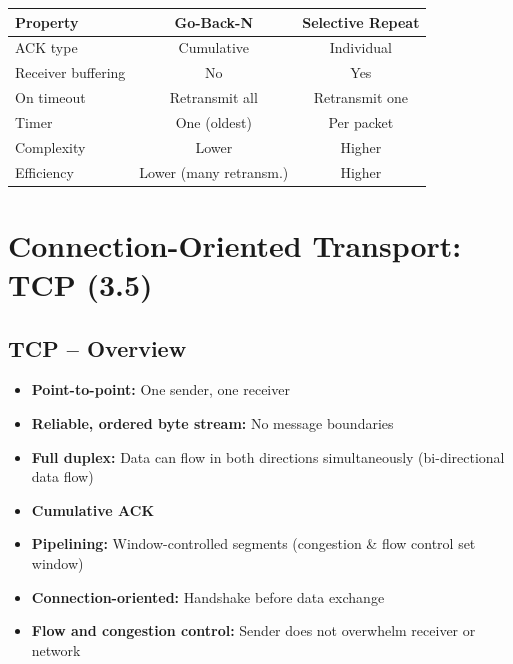 \begin{imagebox}
\end{imagebox}

\begin{center}
\begin{tabular}{lcc}
\toprule
\textbf{Property} & \textbf{Go-Back-N} & \textbf{Selective Repeat} \\
\midrule
ACK type & Cumulative & Individual \\
Receiver buffering & No & Yes \\
On timeout & Retransmit all & Retransmit one \\
Timer & One (oldest) & Per packet \\
Complexity & Lower & Higher \\
Efficiency & Lower (many retransm.) & Higher \\
\bottomrule
\end{tabular}
\end{center}

\section{Connection-Oriented Transport: TCP (3.5)}

\subsection{TCP -- Overview}

\begin{keybox}
\begin{itemize}[noitemsep]
    \item \textbf{Point-to-point:} One sender, one receiver
    \item \textbf{Reliable, ordered byte stream:} No message boundaries
    \item \textbf{Full duplex:} Data can flow in both directions simultaneously (bi-directional data flow)
    \item \textbf{Cumulative ACK}
    \item \textbf{Pipelining:} Window-controlled segments (congestion \& flow control set window)
    \item \textbf{Connection-oriented:} Handshake before data exchange
    \item \textbf{Flow and congestion control:} Sender does not overwhelm receiver or network
\end{itemize}
\end{keybox}

